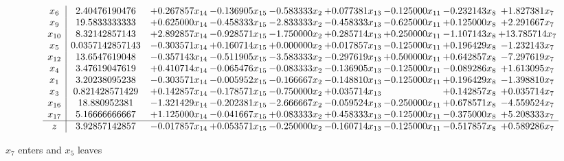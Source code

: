 \documentclass[10pt]{article}
\begin{document}
 \[\begin{array}{c| c c@{\hskip 2pt} c@{\hskip 2pt} c@{\hskip 2pt} c@{\hskip 2pt} c@{\hskip 2pt} c@{\hskip 2pt} c@{\hskip 2pt} }
 x_{6}   &  2.40476190476 & + 0.267857 x_{14} & -0.136905 x_{15} & -0.583333 x_{2} & + 0.077381 x_{13} & -0.125000 x_{11} & -0.232143 x_{8} & + 1.827381 x_{7}\\
 x_{9}   &  19.5833333333 & + 0.625000 x_{14} & -0.458333 x_{15} & -2.833333 x_{2} & -0.458333 x_{13} & -0.625000 x_{11} & + 0.125000 x_{8} & + 2.291667 x_{7}\\
 x_{10}   &  8.32142857143 & + 2.892857 x_{14} & -0.928571 x_{15} & -1.750000 x_{2} & + 0.285714 x_{13} & + 0.250000 x_{11} & -1.107143 x_{8} & + 13.785714 x_{7}\\
 x_{5}   &  0.0357142857143 & -0.303571 x_{14} & + 0.160714 x_{15} & + 0.000000 x_{2} & + 0.017857 x_{13} & -0.125000 x_{11} & + 0.196429 x_{8} & -1.232143 x_{7}\\
 x_{12}   &  13.6547619048 & -0.357143 x_{14} & -0.511905 x_{15} & -3.583333 x_{2} & -0.297619 x_{13} & + 0.500000 x_{11} & + 0.642857 x_{8} & -7.297619 x_{7}\\
 x_{4}   &  3.47619047619 & + 0.410714 x_{14} & -0.065476 x_{15} & -0.083333 x_{2} & -0.136905 x_{13} & -0.125000 x_{11} & -0.089286 x_{8} & + 1.613095 x_{7}\\
 x_{1}   &  3.20238095238 & -0.303571 x_{14} & -0.005952 x_{15} & -0.166667 x_{2} & -0.148810 x_{13} & -0.125000 x_{11} & + 0.196429 x_{8} & -1.398810 x_{7}\\
 x_{3}   &  0.821428571429 & + 0.142857 x_{14} & -0.178571 x_{15} & -0.750000 x_{2} & + 0.035714 x_{13} &   & + 0.142857 x_{8} & + 0.035714 x_{7}\\
 x_{16}   &  18.880952381 & -1.321429 x_{14} & -0.202381 x_{15} & -2.666667 x_{2} & -0.059524 x_{13} & -0.250000 x_{11} & + 0.678571 x_{8} & -4.559524 x_{7}\\
 x_{17}   &  5.16666666667 & + 1.125000 x_{14} & -0.041667 x_{15} & + 0.083333 x_{2} & + 0.458333 x_{13} & -0.125000 x_{11} & -0.375000 x_{8} & + 5.208333 x_{7}\\
\hline
z    &  3.92857142857 & -0.017857 x_{14} & + 0.053571 x_{15} & -0.250000 x_{2} & -0.160714 x_{13} & -0.125000 x_{11} & -0.517857 x_{8} & + 0.589286 x_{7}\\
\end{array}\]


 $ x_{7} $ enters and $ x_{5} $ leaves 
\end{document}
